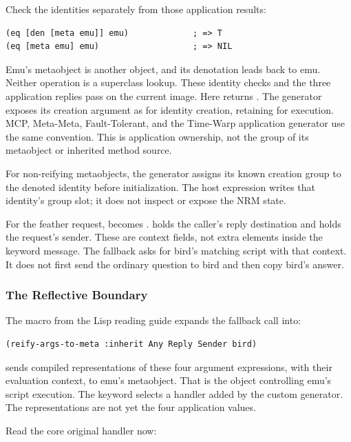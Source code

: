 Check the identities separately from those application results:
\begin{lstlisting}
(eq [den [meta emu]] emu)             ; => T
(eq [meta emu] emu)                   ; => NIL
\end{lstlisting}
Emu's metaobject is another object, and its denotation leads back to emu.
Neither operation is a superclass lookup. These identity checks and
the three application replies pass on the current image.
Here  returns . The generator
exposes its creation argument as  for identity creation,
retaining  for execution. MCP, Meta-Meta, Fault-Tolerant,
and the Time-Warp application generator use the same convention.
This is application ownership, not the group of its metaobject or inherited method source.

For non-reifying metaobjects, the generator assigns its known creation
group to the denoted identity before initialization. The host expression
 writes that
identity's group slot; it does not inspect or expose the NRM state.

For the feather request,  becomes .
 holds the caller's reply destination and 
holds the request's sender. These are context fields, not extra elements
inside the keyword message.
The fallback asks for bird's matching script with that context.
It does not first send the ordinary question 
to bird and then copy bird's answer.

\subsubsection{The Reflective Boundary}

The macro from the Lisp reading guide expands the fallback call into:
\begin{lstlisting}
(reify-args-to-meta :inherit Any Reply Sender bird)
\end{lstlisting}
 sends compiled representations of these four
argument expressions, with their evaluation context, to emu's metaobject.
That is the object controlling emu's script execution.
The keyword  selects a handler added by the custom generator.
The representations are not yet the four application values.

Read the core original handler now:

